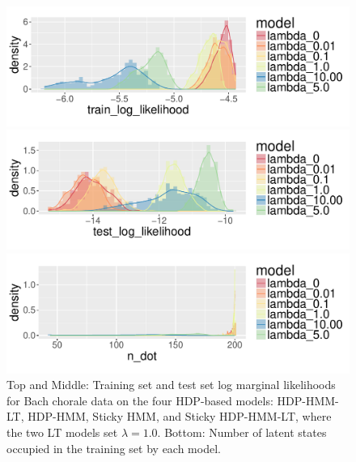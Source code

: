 \begin{figure}[tb]
\begin{center}
  \centerline{\includegraphics[width = 0.75\columnwidth]{fig/music/bach/varying_lambda_eps0005/train_log_likelihood_density.pdf}}
  \centerline{\includegraphics[width = 0.75\columnwidth]{fig/music/bach/varying_lambda_eps0005/test_log_likelihood_density.pdf}}
  \centerline{\includegraphics[width = 0.75\columnwidth]{fig/music/bach/varying_lambda_eps0005/n_dot_density.pdf}}
\caption{Top and Middle: Training set and test set log marginal likelihoods for Bach
  chorale data on the four HDP-based models: HDP-HMM-LT, HDP-HMM,
  Sticky HMM, and Sticky HDP-HMM-LT, where the two LT models set
  $\lambda = 1.0$.  Bottom: Number of latent states
  occupied in the training set by each model. \label{fig:bach-hyperparameter-all-lambdas}
}
\end{center}
\end{figure}

